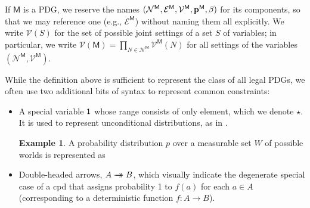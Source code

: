 \documentclass{article}
\theoremstyle{plain}
\theoremstyle{definition}
\newtheorem{examplex}{Example}
\theoremstyle{remark}
\newcommand{\doubleheadrightarrow}{%
	\rightarrow\mathrel{\mspace{-15mu}}\rightarrow}
\newcommand{\V}{\mathcal V}
\newcommand{\N}{\mathcal N}
\newcommand{\Ed}{\mathcal E}
\newcommand{\sfM}{\mathsf M}
\newcommand{\MN}{PDG}
\newcommand{\MNs}{\MN s}
\numberwithin{equation}{section}
\begin{document}
	If $\sfM$ is a \MN, we reserve the names $\mnvars[^\sfM]$ for its components, so that we may reference one (e.g., $\Ed^\sfM$) without naming them all explicitly.
	We write $\V(S)$ for the set of possible joint settings of a set $S$
        of variables; in particular, 
	we write $\V(\sfM)
		= \prod_{N \in \N^\sfM} \V^\sfM(N)$
	 for all settings of the variables $(\N^\sfM, \V^\sfM)$.
	

	While the definition above is sufficient to represent the class of all legal \MNs,
	we often use two additional bits of syntax to represent common constraints:  
	\begin{itemize}
	\item A special variable $\sf 1$ 
whose range consists of only element, which we denote $\star$.
It is used to represent
          unconditional distributions, as in
                  .  
	\begin{vleftovers}
		\begin{examplex}\label{ex:worldsonly}
			A probability distribution $p$ over a measurable set $W$ of possible worlds is represented as 
			\begin{center}
			\end{center}
		\end{examplex}
	\end{vleftovers}
		\item Double-headed arrows, $A \doubleheadrightarrow
                  B$, which visually indicate the degenerate special
                  case of a cpd that assigns probability 1 to $f(a)$
                  for each $a \in A$ (corresponding to a deterministic
                  function $f : A \to B$). 
	\end{itemize}
\end{document}
